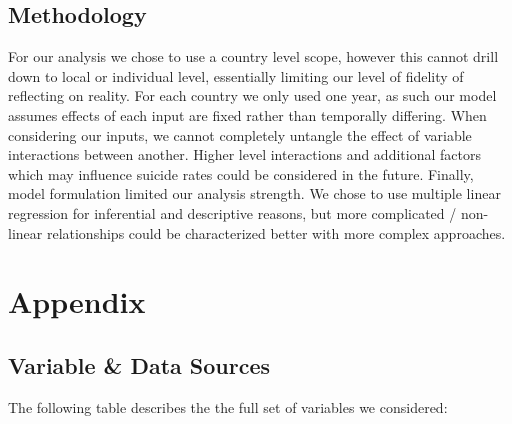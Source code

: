 \documentclass[]{article}
\begin{document}
\subsection{Methodology}\label{methodology}

For our analysis we chose to use a country level scope, however this
cannot drill down to local or individual level, essentially limiting our
level of fidelity of reflecting on reality. For each country we only
used one year, as such our model assumes effects of each input are fixed
rather than temporally differing. When considering our inputs, we cannot
completely untangle the effect of variable interactions between another.
Higher level interactions and additional factors which may influence
suicide rates could be considered in the future. Finally, model
formulation limited our analysis strength. We chose to use multiple
linear regression for inferential and descriptive reasons, but more
complicated / non-linear relationships could be characterized better
with more complex approaches.

\newpage 

\section{Appendix}\label{appendix}

\subsection{Variable \& Data Sources}\label{variable-data-sources}

The following table describes the the full set of variables we
considered:
\end{document}
